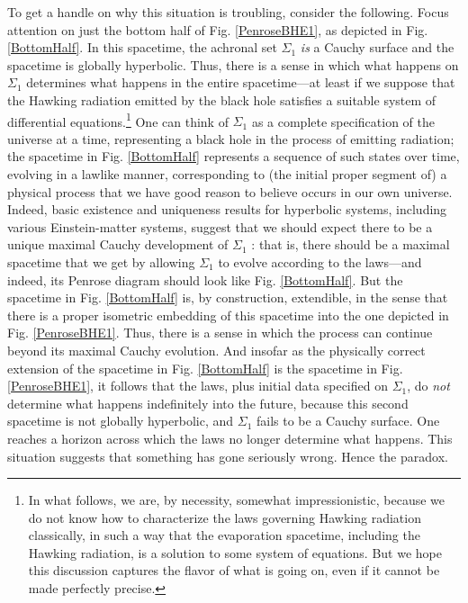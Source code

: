 \documentclass[authoryear,12pt,3p]{jowarticle}
\begin{document}
To get a handle on why this situation is troubling, consider the following.  Focus attention on just the bottom half of Fig. \ref{PenroseBHE1}, as depicted in Fig. \ref{BottomHalf}.  In this spacetime, the achronal set $\Sigma_1$ \emph{is} a Cauchy surface and the spacetime is globally hyperbolic.  Thus, there is a sense in which what happens on $\Sigma_1$ determines what happens in the entire spacetime---at least if we suppose that the Hawking radiation emitted by the black hole satisfies a suitable system of differential equations.\footnote{In what follows, we are, by necessity, somewhat impressionistic, because we do not know how to characterize the laws governing Hawking radiation classically, in such a way that the evaporation spacetime, including the Hawking radiation, is a solution to some system of equations.  But we hope this discussion captures the flavor of what is going on, even if it cannot be made perfectly precise.}  One can think of $\Sigma_1$ as a complete specification of the universe at a time, representing a black hole in the process of emitting radiation; the spacetime in Fig. \ref{BottomHalf} represents a sequence of such states over time, evolving in a lawlike manner, corresponding to  (the initial proper segment of) a physical process that we have good reason to believe occurs in our own universe.  Indeed, basic existence and uniqueness results for hyperbolic systems, including various Einstein-matter systems, suggest that we should expect there to be a unique maximal Cauchy development of $\Sigma_1$ \citep{GerochPDE,Rendall}: that is, there should be a maximal spacetime that we get by allowing $\Sigma_1$ to evolve according to the laws---and indeed, its Penrose diagram should look like Fig. \ref{BottomHalf}.   But the spacetime in Fig. \ref{BottomHalf} is, by construction, extendible, in the sense that there is a proper isometric embedding of this spacetime into the one depicted in Fig. \ref{PenroseBHE1}.  Thus, there is a sense in which the process can continue beyond its maximal Cauchy evolution.  And insofar as the physically correct extension of the spacetime in Fig. \ref{BottomHalf} is the spacetime in Fig. \ref{PenroseBHE1}, it follows that the laws, plus initial data specified on $\Sigma_1$, do \emph{not} determine what happens indefinitely into the future, because this second spacetime is not globally hyperbolic, and $\Sigma_1$ fails to be a Cauchy surface.  One reaches a horizon across which the laws no longer determine what happens.  This situation suggests that something has gone seriously wrong.  Hence the paradox.
\end{document}
